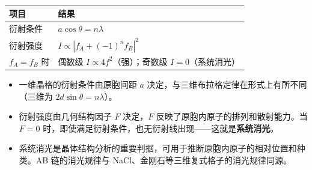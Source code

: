 \begin{formulabox}[答案汇总]
\begin{center}
\begin{tabular}{ll}
\toprule
\textbf{项目} & \textbf{结果} \\
\midrule
衍射条件 & $a\cos\theta=n\lambda$ \\
衍射强度 & $I\propto|f_A+(-1)^nf_B|^2$ \\
$f_A=f_B$ 时 & 偶数级 $I\propto4f^2$（强）；奇数级 $I=0$（系统消光） \\
\bottomrule
\end{tabular}
\end{center}
\end{formulabox}

\begin{insightbox}[物理图像]
\begin{itemize}
    \item 一维晶格的衍射条件由原胞间距 $a$ 决定，与三维布拉格定律在形式上有所不同（三维为 $2d\sin\theta=n\lambda$）。
    \item 衍射强度由几何结构因子 $F$ 决定，$F$ 反映了原胞内原子的排列和散射能力。当 $F=0$ 时，即使满足衍射条件，也无衍射线出现——这就是\textbf{系统消光}。
    \item 系统消光是晶体结构分析的重要判据，可用于推断原胞内原子的相对位置和种类。AB 链的消光规律与 NaCl、金刚石等三维复式格子的消光规律同源。
\end{itemize}
\end{insightbox}
